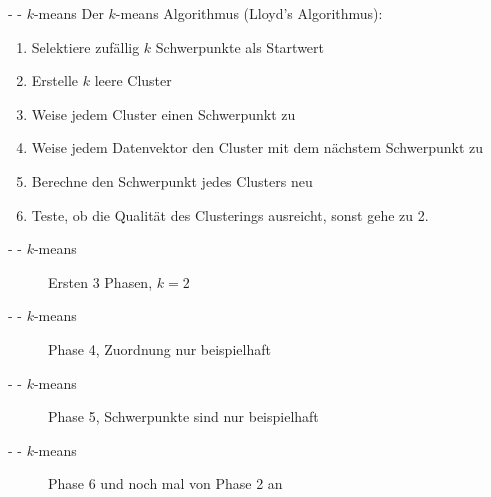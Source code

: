 \documentclass[fleqn,11pt,aspectratio=43]{beamer}
\begin{document}
\begin{frame}{\insertsectionhead - \insertsubsectionhead - $k$-means \cite{dwh}}
Der $k$-means Algorithmus (Lloyd's Algorithmus):
\vspace{1em}
\begin{enumerate}[label=\bfseries\arabic*.]
\setlength{\itemsep}{10pt}
\item Selektiere zufällig $k$ Schwerpunkte als Startwert
\item Erstelle $k$ leere Cluster
\item Weise jedem Cluster einen Schwerpunkt zu
\item Weise jedem Datenvektor den Cluster mit dem nächstem Schwerpunkt zu
\item Berechne den Schwerpunkt jedes Clusters neu
\item Teste, ob die Qualität des Clusterings ausreicht, sonst gehe zu 2.
\end{enumerate}
\end{frame}

\begin{frame}{\insertsectionhead - \insertsubsectionhead - $k$-means}
\begin{figure}
\scalebox{1.1}{}
\caption{Ersten 3 Phasen, $k = 2$}
\end{figure}
\end{frame}

\begin{frame}{\insertsectionhead - \insertsubsectionhead - $k$-means}
\begin{figure}
\scalebox{1.1}{}
\caption{Phase 4, Zuordnung nur beispielhaft}
\end{figure}
\end{frame}

\begin{frame}{\insertsectionhead - \insertsubsectionhead - $k$-means}
\begin{figure}
\scalebox{1.1}{}
\caption{Phase 5, Schwerpunkte sind nur beispielhaft}
\end{figure}
\end{frame}

\begin{frame}{\insertsectionhead - \insertsubsectionhead - $k$-means}
\begin{figure}
\scalebox{1.1}{}
\caption{Phase 6 und noch mal von Phase 2 an}
\end{figure}
\end{frame}
\end{document}
